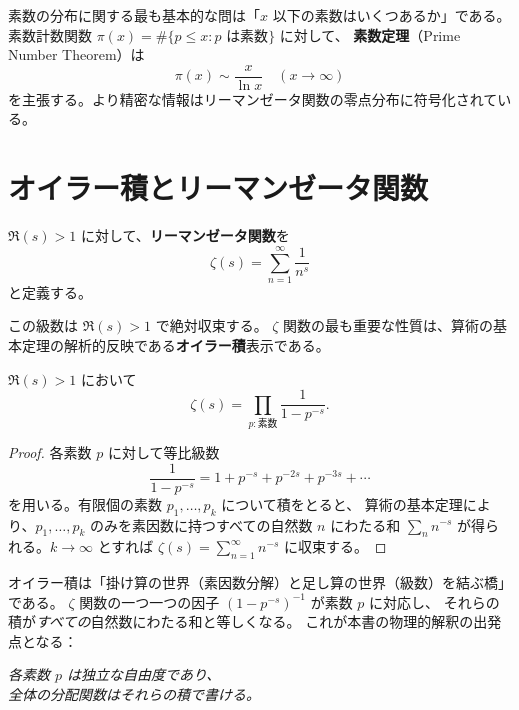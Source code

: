 素数の分布に関する最も基本的な問は「$x$ 以下の素数はいくつあるか」である。
素数計数関数 $\pi(x) = \#\{p \le x : p \text{ は素数}\}$ に対して、
\textbf{素数定理}（Prime Number Theorem）は
\[
  \pi(x) \sim \frac{x}{\ln x} \quad (x \to \infty)
\]
を主張する。より精密な情報はリーマンゼータ関数の零点分布に符号化されている。


\section{オイラー積とリーマンゼータ関数}
\label{sec:euler-product}

\begin{definition}[リーマンゼータ関数]
\label{def:zeta}
$\Re(s) > 1$ に対して、\textbf{リーマンゼータ関数}を
\[
  \zeta(s) = \sum_{n=1}^{\infty} \frac{1}{n^s}
\]
と定義する。
\end{definition}

この級数は $\Re(s) > 1$ で絶対収束する。
$\zeta$ 関数の最も重要な性質は、算術の基本定理の解析的反映である\textbf{オイラー積}表示である。

\begin{theorem}[オイラー積, 1737]
\label{thm:euler-product}
$\Re(s) > 1$ において
\[
  \zeta(s) = \prod_{p:\text{素数}} \frac{1}{1 - p^{-s}}.
\]
\end{theorem}

\begin{proof}
各素数 $p$ に対して等比級数
\[
  \frac{1}{1 - p^{-s}} = 1 + p^{-s} + p^{-2s} + p^{-3s} + \cdots
\]
を用いる。有限個の素数 $p_1, \ldots, p_k$ について積をとると、
算術の基本定理により、$p_1, \ldots, p_k$ のみを素因数に持つすべての自然数 $n$ にわたる和
$\sum_{n} n^{-s}$ が得られる。$k \to \infty$ とすれば $\zeta(s) = \sum_{n=1}^{\infty} n^{-s}$
に収束する。
\end{proof}

\begin{hsbox}
オイラー積は「掛け算の世界（素因数分解）と足し算の世界（級数）を結ぶ橋」である。
$\zeta$ 関数の一つ一つの因子 $(1-p^{-s})^{-1}$ が素数 $p$ に対応し、
それらの積が\emph{すべての}自然数にわたる和と等しくなる。
これが本書の物理的解釈の出発点となる：
\begin{center}
\emph{各素数 $p$ は独立な自由度であり、\\
全体の分配関数はそれらの積で書ける。}
\end{center}
\end{hsbox}

